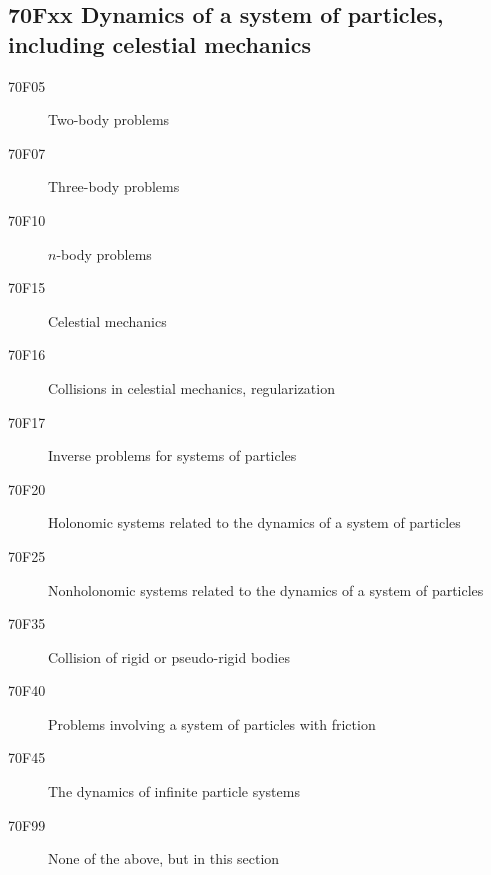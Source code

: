\documentclass[letterpaper]{article}
\begin{document}
\subsection*{70Fxx  Dynamics of a system of particles, including celestial mechanics }\label{70Fxx}
\begin{description}  
\item [70F05]\label{70F05} Two-body problems
\item [70F07]\label{70F07} Three-body problems
\item [70F10]\label{70F10} $n$-body problems
\item [70F15]\label{70F15} Celestial mechanics
\item [70F16]\label{70F16} Collisions in celestial mechanics, regularization
\item [70F17]\label{70F17} Inverse problems for systems of particles
\item [70F20]\label{70F20} Holonomic systems related to the dynamics of a system of particles
\item [70F25]\label{70F25} Nonholonomic systems related to the dynamics of a system of particles
\item [70F35]\label{70F35} Collision of rigid or pseudo-rigid bodies
\item [70F40]\label{70F40} Problems involving a system of particles with friction
\item [70F45]\label{70F45} The dynamics of infinite particle systems
\item [70F99]\label{70F99} None of the above, but in this section
\end{description}
\end{document}
